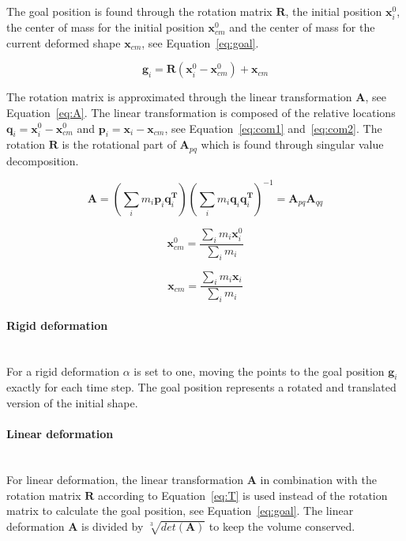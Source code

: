     The goal position is found through the rotation matrix $\mathbf{R}$, the initial position $\mathbf{x}^0_i$, the center of mass for the initial position $\mathbf{x}^0_{cm}$ and the center of mass for the current deformed shape $\mathbf{x}_{cm}$, see Equation~\ref{eq:goal}.
   
    \begin{equation}\label{eq:goal}
        \mathbf{g}_i = \mathbf{R}(\mathbf{x}^0_i - \mathbf{x}^0_{cm}) + \mathbf{x}_{cm}
    \end{equation}

    The rotation matrix is approximated through the linear transformation $\mathbf{A}$, see Equation~\ref{eq:A}.
    The linear transformation is composed of the relative locations $\mathbf{q}_i = \mathbf{x}^0_i - \mathbf{x}^0_{cm}$ and $\mathbf{p}_i = \mathbf{x}_i - \mathbf{x}_{cm}$, see Equation~\ref{eq:com1} and~\ref{eq:com2}.
    The rotation $\mathbf{R}$ is the rotational part of $\mathbf{A}_{pq}$ which is found through singular value decomposition.

    \begin{equation} \label{eq:A}
        \mathbf{A} = (\sum_i{m_i\mathbf{p}_i\mathbf{q}_i^{\mathbf{T}}})
        (\sum_i{m_i\mathbf{q}_i\mathbf{q}_i^{\mathbf{T}}})^{-1} 
        = \mathbf{A}_{pq}\mathbf{A}_{qq}
    \end{equation}

    \begin{equation} \label{eq:com1}
        \mathbf{x}^0_{cm} = \frac{\sum_i{m_i\mathbf{x}_i^0}}{\sum_i{m_i}}
    \end{equation}

    \begin{equation} \label{eq:com2}
        \mathbf{x}_{cm} = \frac{\sum_i{m_i\mathbf{x}_i}}{\sum_i{m_i}}
    \end{equation}

    \paragraph{Rigid deformation}\mbox{}\\[5px]
    For a rigid deformation $\alpha$ is set to one, moving the points to the goal position $\mathbf{g}_i$ exactly for each time step.
    The goal position represents a rotated and translated version of the initial shape.

    \paragraph{Linear deformation}\mbox{}\\[5px]
    For linear deformation, the linear transformation $\mathbf{A}$ in combination with the rotation matrix $\mathbf{R}$ according to Equation~\ref{eq:T} is used instead of the rotation matrix to calculate the goal position, see Equation~\ref{eq:goal}.
    The linear deformation $\mathbf{A}$ is divided by $\sqrt[3]{det(\mathbf{A})}$ to keep the volume conserved.

